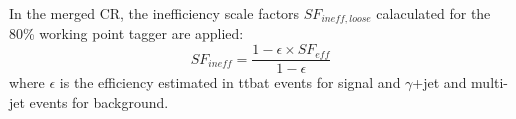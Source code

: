 In the merged CR, the inefficiency scale factors $SF_{ineff,loose}$ calaculated for the 80\% working point tagger are applied:
\begin{equation}
S F_{i n e f f}=\frac{1-\epsilon \times S F_{e f f}}{1-\epsilon}
\end{equation}
where $\epsilon$ is the efficiency estimated in ttbat events for signal and $\gamma$+jet and multi-jet events for background.


